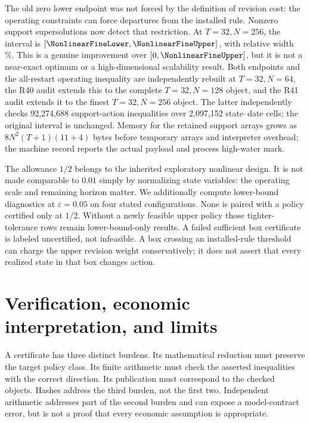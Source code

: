 The old zero lower endpoint was not forced by the definition of revision cost: the operating constraints can force departures from the installed rule. Nonzero support supersolutions now detect that restriction. At $T=32,N=256$, the interval is $[\NonlinearFineLower,\NonlinearFineUpper]$, with relative width \NonlinearFineRelative\%. This is a genuine improvement over $[0,\NonlinearFineUpper]$, but it is not a near-exact optimum or a high-dimensional scalability result. Both endpoints and the all-restart operating inequality are independently rebuilt at $T=32,N=64$, the R40 audit extends this to the complete $T=32,N=128$ object, and the R41 audit extends it to the finest $T=32,N=256$ object. The latter independently checks 92,274,688 support-action inequalities over 2,097,152 state--date cells; the original interval is unchanged. Memory for the retained support arrays grows as $8N^2(T+1)(11+4)$ bytes before temporary arrays and interpreter overhead; the machine record reports the actual payload and process high-water mark.

The allowance $1/2$ belongs to the inherited exploratory nonlinear design. It is not made comparable to $0.01$ simply by normalizing state variables: the operating scale and remaining horizon matter. We additionally compute lower-bound diagnostics at $\varepsilon=0.05$ on four stated configurations. None is paired with a policy certified only at $1/2$. Without a newly feasible upper policy those tighter-tolerance rows remain lower-bound-only results. A failed sufficient box certificate is labeled uncertified, not infeasible. A box crossing an installed-rule threshold can charge the upper revision weight conservatively; it does not assert that every realized state in that box changes action.

\section{Verification, economic interpretation, and limits}\label{sec:verification}
A certificate has three distinct burdens. Its mathematical reduction must preserve the target policy class. Its finite arithmetic must check the asserted inequalities with the correct direction. Its publication must correspond to the checked objects. Hashes address the third burden, not the first two. Independent arithmetic addresses part of the second burden and can expose a model-contract error, but is not a proof that every economic assumption is appropriate.

